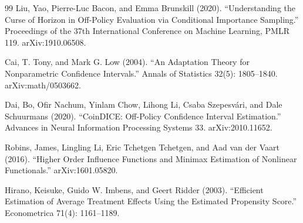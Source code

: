 \documentclass{article}
\begin{document}
\begin{thebibliography}{99}
   Liu, Yao, Pierre-Luc Bacon, and Emma Brunskill (2020). ``Understanding the Curse of Horizon in Off-Policy Evaluation via Conditional Importance Sampling.'' Proceedings of the 37th International Conference on Machine Learning, PMLR 119. arXiv:1910.06508.

   Cai, T. Tony, and Mark G. Low (2004). ``An Adaptation Theory for Nonparametric Confidence Intervals.'' Annals of Statistics 32(5): 1805--1840. arXiv:math/0503662.

   Dai, Bo, Ofir Nachum, Yinlam Chow, Lihong Li, Csaba Szepesv\'{a}ri, and Dale Schuurmans (2020). ``CoinDICE: Off-Policy Confidence Interval Estimation.'' Advances in Neural Information Processing Systems 33. arXiv:2010.11652.

   Robins, James, Lingling Li, Eric Tchetgen Tchetgen, and Aad van der Vaart (2016). ``Higher Order Influence Functions and Minimax Estimation of Nonlinear Functionals.'' arXiv:1601.05820.

   Hirano, Keisuke, Guido W. Imbens, and Geert Ridder (2003). ``Efficient Estimation of Average Treatment Effects Using the Estimated Propensity Score.'' Econometrica 71(4): 1161--1189.

\end{thebibliography}
\end{document}
